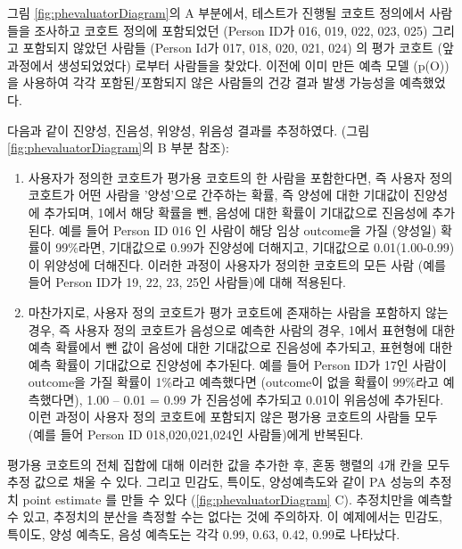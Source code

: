 \documentclass[10.5pt]{book}
\theoremstyle{definition}
\theoremstyle{definition}
\theoremstyle{definition}
\theoremstyle{remark}
\begin{document}
그림 \ref{fig:phevaluatorDiagram}의 A 부분에서, 테스트가 진행될 코호트
정의에서 사람들을 조사하고 코호트 정의에 포함되었던 (Person ID가 016,
019, 022, 023, 025) 그리고 포함되지 않았던 사람들 (Person Id가 017, 018,
020, 021, 024) 의 평가 코호트 (앞 과정에서 생성되었었다) 로부터 사람들을
찾았다. 이전에 이미 만든 예측 모델 (p(O)) 을 사용하여 각각
포함된/포함되지 않은 사람들의 건강 결과 발생 가능성을 예측했었다.

다음과 같이 진양성, 진음성, 위양성, 위음성 결과를 추정하였다. (그림
\ref{fig:phevaluatorDiagram}의 B 부분 참조):

\begin{enumerate}
\def\labelenumi{\arabic{enumi}.}
\item
  사용자가 정의한 코호트가 평가용 코호트의 한 사람을 포함한다면, 즉
  사용자 정의 코호트가 어떤 사람을 '양성'으로 간주하는 확률, 즉 양성에
  대한 기대값이 진양성에 추가되며, 1에서 해당 확률을 뺀, 음성에 대한
  확률이 기대값으로 진음성에 추가된다. 예를 들어 Person ID 016 인 사람이
  해당 임상 outcome을 가질 (양성일) 확률이 99\%라면, 기대값으로 0.99가
  진양성에 더해지고, 기대값으로 0.01(1.00-0.99)이 위양성에 더해진다.
  이러한 과정이 사용자가 정의한 코호트의 모든 사람 (예를 들어 Person
  ID가 19, 22, 23, 25인 사람들)에 대해 적용된다.
\item
  마찬가지로, 사용자 정의 코호트가 평가 코호트에 존재하는 사람을
  포함하지 않는 경우, 즉 사용자 정의 코호트가 음성으로 예측한 사람의
  경우, 1에서 표현형에 대한 예측 확률에서 뺀 값이 음성에 대한 기대값으로
  진음성에 추가되고, 표현형에 대한 예측 확률이 기대값으로 진양성에
  추가된다. 예를 들어 Person ID가 17인 사람이 outcome을 가질 확률이
  1\%라고 예측했다면 (outcome이 없을 확률이 99\%라고 예측했다면), 1.00
  -- 0.01 = 0.99 가 진음성에 추가되고 0.01이 위음성에 추가된다. 이런
  과정이 사용자 정의 코호트에 포함되지 않은 평가용 코호트의 사람들 모두
  (예를 들어 Person ID 018,020,021,024인 사람들)에게 반복된다.
\end{enumerate}

평가용 코호트의 전체 집합에 대해 이러한 값을 추가한 후, 혼동 행렬의 4개
칸을 모두 추정 값으로 채울 수 있다. 그리고 민감도, 특이도, 양성예측도와
같이 PA 성능의 추정치 point estimate 를 만들 수 있다
(\ref{fig:phevaluatorDiagram} C). 추정치만을 예측할 수 있고, 추정치의
분산을 측정할 수는 없다는 것에 주의하자. 이 예제에서는 민감도, 특이도,
양성 예측도, 음성 예측도는 각각 0.99, 0.63, 0.42, 0.99로 나타났다.
\end{document}
